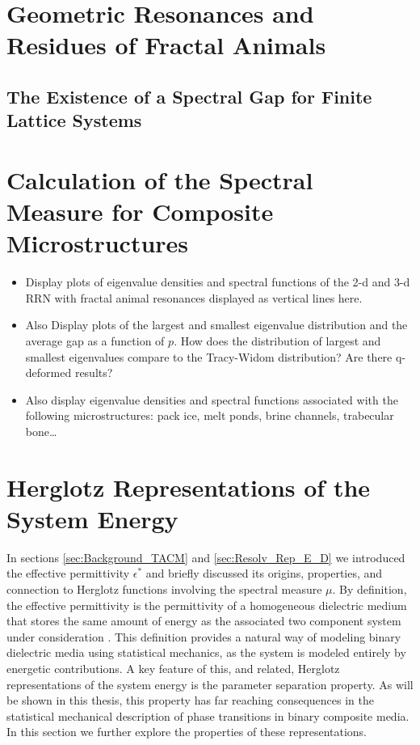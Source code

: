 \documentclass[english,12pt]{ttuthes}
\begin{document}
\section{Geometric Resonances and Residues of Fractal
  Animals} \label{sec:Fractal_Animals} 
%
\subsection{The Existence of a Spectral Gap for Finite Lattice
  Systems} \label{sec:Spectral_Gap}
%
\section{Calculation of the Spectral Measure for Composite
  Microstructures}
\label{sec:Calc_Spec_Meas_Comp_Micro}
%
\begin{itemize}
\item Display plots of eigenvalue densities and spectral
  functions of the 2-d and 3-d RRN with fractal animal resonances
  displayed as vertical lines here.
\item Also Display plots of the largest and smallest eigenvalue
  distribution and the average gap as a function of $p$. How does the
  distribution of largest and smallest eigenvalues compare to the
  Tracy-Widom distribution? Are there q-deformed results?
\item Also display eigenvalue densities and spectral functions
  associated with the following microstructures: pack ice, melt ponds,
  brine channels, trabecular bone\ldots  
\end{itemize}
%
\section{Herglotz Representations of the System Energy}
\label{sec:Herglotz_Energy_Reps}
%
In sections \ref{sec:Background_TACM} and \ref{sec:Resolv_Rep_E_D} we
introduced the effective permittivity $\epsilon^*$ and briefly discussed
its origins, properties, and connection to Herglotz functions
involving the spectral measure $\mu$. By definition, the effective
permittivity is the permittivity of a homogeneous dielectric medium
that stores the same amount of energy as the associated two component
system under consideration \cite{MILTON:2002:TC}. This definition
provides a natural way of modeling binary dielectric media using
statistical mechanics, as the system is modeled entirely by energetic 
contributions. A key feature of this, and related, Herglotz
representations of the system energy is the parameter separation
property. As will be shown in this thesis, this property has far
reaching consequences in the statistical mechanical description of
phase transitions in binary composite media. In this section we 
further explore the properties of these representations.
\end{document}
